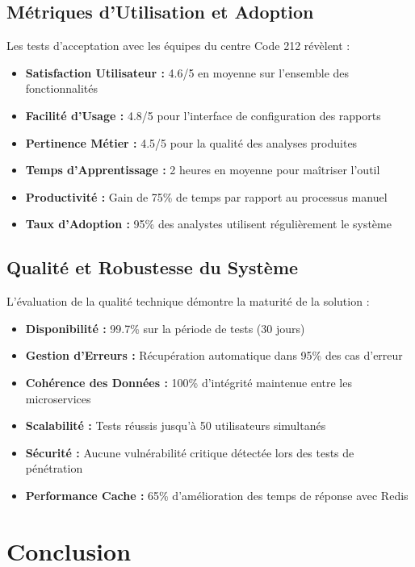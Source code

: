 \subsection{Métriques d'Utilisation et Adoption}

Les tests d'acceptation avec les équipes du centre Code 212 révèlent :

\begin{itemize}
    \item \textbf{Satisfaction Utilisateur :} 4.6/5 en moyenne sur l'ensemble des fonctionnalités
    \item \textbf{Facilité d'Usage :} 4.8/5 pour l'interface de configuration des rapports
    \item \textbf{Pertinence Métier :} 4.5/5 pour la qualité des analyses produites
    \item \textbf{Temps d'Apprentissage :} 2 heures en moyenne pour maîtriser l'outil
    \item \textbf{Productivité :} Gain de 75\% de temps par rapport au processus manuel
    \item \textbf{Taux d'Adoption :} 95\% des analystes utilisent régulièrement le système
\end{itemize}

\subsection{Qualité et Robustesse du Système}

L'évaluation de la qualité technique démontre la maturité de la solution :

\begin{itemize}
    \item \textbf{Disponibilité :} 99.7\% sur la période de tests (30 jours)
    \item \textbf{Gestion d'Erreurs :} Récupération automatique dans 95\% des cas d'erreur
    \item \textbf{Cohérence des Données :} 100\% d'intégrité maintenue entre les microservices
    \item \textbf{Scalabilité :} Tests réussis jusqu'à 50 utilisateurs simultanés
    \item \textbf{Sécurité :} Aucune vulnérabilité critique détectée lors des tests de pénétration
    \item \textbf{Performance Cache :} 65\% d'amélioration des temps de réponse avec Redis
\end{itemize}

\section{Conclusion}

